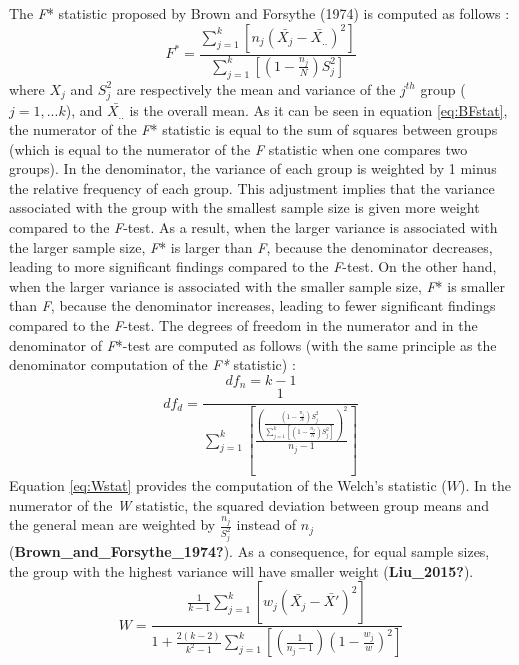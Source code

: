 \documentclass[
  english,
  man]{apa6}
\begin{document}
The \emph{F}* statistic proposed by Brown and Forsythe (1974) is computed as follows :
\begin{equation} 
F^*= \frac{\sum_{j=1}^k\left[n_j(\bar{X_j}-\bar{X_{..}})^2\right]}{\sum_{j=1}^k \left[\left(1-\frac{n_j}{N}\right)S_j^2\right]}
\label{eqn:BFstat}
\end{equation}
where \(X_j\) and \(S_j^2\) are respectively the mean and variance of the \(j^{th}\) group (\(j= 1,...k\)), and \(\bar{X_{..}}\) is the overall mean. As it can be seen in equation \ref{eq:BFstat}, the numerator of the \emph{F}* statistic is equal to the sum of squares between groups (which is equal to the numerator of the \emph{F} statistic when one compares two groups). In the denominator, the variance of each group is weighted by 1 minus the relative frequency of each group. This adjustment implies that the variance associated with the group with the smallest sample size is given more weight compared to the \emph{F}-test. As a result, when the larger variance is associated with the larger sample size, \emph{F}* is larger than \emph{F}, because the denominator decreases, leading to more significant findings compared to the \emph{F}-test. On the other hand, when the larger variance is associated with the smaller sample size, \emph{F}* is smaller than \emph{F}, because the denominator increases, leading to fewer significant findings compared to the \emph{F}-test. The degrees of freedom in the numerator and in the denominator of \emph{F}*-test are computed as follows (with the same principle as the denominator computation of the \emph{F*} statistic) :
\begin{equation*} 
df_n= k-1
\label{eqn:BFnumDF}
\end{equation*}
\begin{equation*} 
df_d= \frac{1}{\sum_{j=1}^k\left[\frac{\left(\frac{\left(1-\frac{n_j}{N}\right)S_j^2}{\sum_{j=1}^k\left[\left(1-\frac{n_j}{N}\right)S_j^2\right]}\right)^2}{n_j-1}\right]}
\label{eqn:BFdenomDF}
\end{equation*}
Equation \ref{eq:Wstat} provides the computation of the Welch's statistic (\(W\)). In the numerator of the \emph{W} statistic, the squared deviation between group means and the general mean are weighted by \(\frac{n_j}{S_j^2}\) instead of \(n_j\) (\textbf{Brown\_and\_Forsythe\_1974?}). As a consequence, for equal sample sizes, the group with the highest variance will have smaller weight (\textbf{Liu\_2015?}).
\begin{equation} 
W=\frac{\frac{1}{k-1}\sum_{j=1}^k\left[w_j(\bar{X_j}-\bar{X'})^2\right]}
{1+\frac{2(k-2)}{k^2-1}\sum_{j=1}^k\left[(\frac{1}{n_j-1})(1-\frac{w_j}{w})^2\right]}
\label{eqn:Wstat}
\end{equation}
\end{document}

